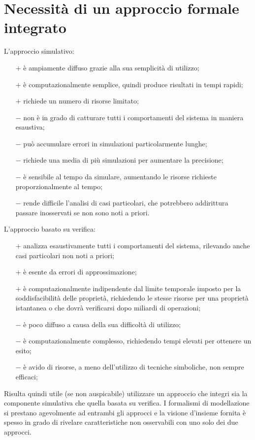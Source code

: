 	\section{Necessit\`a di un approccio formale integrato}
		L'approccio simulativo:
		\begin{itemize}
			\item [$+$] \`e ampiamente diffuso grazie alla sua semplicit\`a di utilizzo;
			\item [$+$] \`e computazionalmente semplice, quindi produce risultati in tempi rapidi;
			\item [$+$] richiede un numero di risorse limitato;
			\item [$-$] non \`e in grado di catturare tutti i comportamenti del sistema in maniera esaustiva;
			\item [$-$] pu\`o accumulare errori in simulazioni particolarmente lunghe;
			\item [$-$] richiede una media di pi\`u simulazioni per aumentare la precisione;
			\item [$-$] \`e sensibile al tempo da simulare, aumentando le risorse richieste proporzionalmente al tempo;
			\item [$-$] rende difficile l'analisi di casi particolari, che potrebbero addirittura passare inosservati se non sono noti a priori.
		\end{itemize}
		
		L'approccio basato su verifica:
		\begin{itemize}
			\item [$+$] analizza esaustivamente tutti i comportamenti del sistema, rilevando anche casi particolari non noti a priori;
			\item [$+$] \`e esente da errori di approssimazione;
			\item [$+$] \`e computazionalmente indipendente dal limite temporale imposto per la soddisfacibilit\`a delle propriet\`a, richiedendo le stesse risorse per una propriet\`a istantanea o che dovr\`a verificarsi dopo miliardi di operazioni;
			\item [$-$] \`e poco diffuso a causa della sua difficolt\`a di utilizzo;
			\item [$-$] \`e computazionalmente complesso, richiedendo tempi elevati per ottenere un esito;
			\item [$-$] \`e avido di risorse, a meno dell'utilizzo di tecniche simboliche, non sempre efficaci;
		\end{itemize}
		
		Risulta quindi utile (se non auspicabile) utilizzare un approccio che integri sia la componente simulativa che quella basata su verifica.
		I formalismi di modellazione si prestano agevolmente ad entrambi gli approcci e la visione d'insieme fornita \`e spesso in grado di rivelare caratteristiche non osservabili con uno solo dei due approcci.
		
